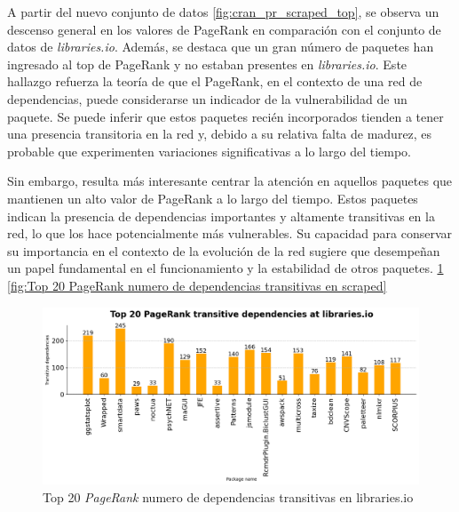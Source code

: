 A partir del nuevo conjunto de datos \ref{fig:cran_pr_scraped_top}, se observa un descenso general en los
valores de PageRank en comparación con el conjunto de datos de \textit{libraries.io}. Además, se destaca
que un gran número de paquetes han ingresado al top de PageRank y no estaban presentes en \textit{libraries.io}.
Este hallazgo refuerza la teoría de que el PageRank, en el contexto de una red de dependencias, puede
considerarse un indicador de la vulnerabilidad de un paquete. Se puede inferir que estos paquetes recién
incorporados tienden a tener una presencia transitoria en la red y, debido a su relativa falta de madurez,
es probable que experimenten variaciones significativas a lo largo del tiempo.

Sin embargo, resulta más interesante centrar la atención en aquellos paquetes que mantienen un alto valor de
PageRank a lo largo del tiempo. Estos paquetes indican la presencia de dependencias importantes y altamente
transitivas en la red, lo que los hace potencialmente más vulnerables. Su capacidad para conservar su
importancia en el contexto de la evolución de la red sugiere que desempeñan un papel fundamental en el
funcionamiento y la estabilidad de otros paquetes. \ref{fig:Top 20 PageRank numero de dependencias transitivas en libraries.io}
\ref{fig:Top 20 PageRank numero de dependencias transitivas en scraped}

\begin{figure}[h!]
    \begin{center}
        \includegraphics[width=1\textwidth]{img/cran/pr_trans.png}
        \caption{Top 20 \textit{PageRank} numero de dependencias transitivas en libraries.io}
        \label{fig:Top 20 PageRank numero de dependencias transitivas en libraries.io}
    \end{center}
\end{figure}

